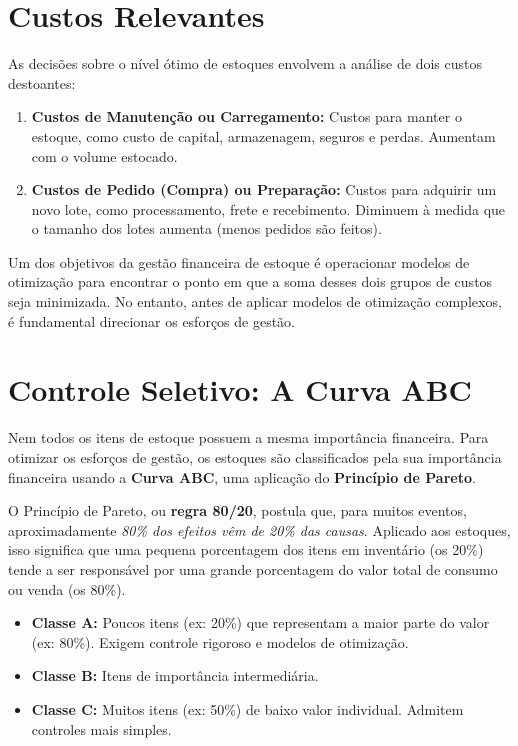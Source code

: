 \documentclass[
  a4paper,
]{book}
\providecommand{\tightlist}{%
  \setlength{\itemsep}{0pt}\setlength{\parskip}{0pt}}\usepackage{longtable,booktabs,array}
\begin{document}
\section{Custos Relevantes}\label{custos-relevantes}

As decisões sobre o nível ótimo de estoques envolvem a análise de dois
custos destoantes:

\begin{enumerate}
\def\labelenumi{\arabic{enumi}.}
\tightlist
\item
  \textbf{Custos de Manutenção ou Carregamento:} Custos para manter o
  estoque, como custo de capital, armazenagem, seguros e perdas.
  Aumentam com o volume estocado.
\item
  \textbf{Custos de Pedido (Compra) ou Preparação:} Custos para adquirir
  um novo lote, como processamento, frete e recebimento. Diminuem à
  medida que o tamanho dos lotes aumenta (menos pedidos são feitos).
\end{enumerate}

Um dos objetivos da gestão financeira de estoque é operacionar modelos
de otimização para encontrar o ponto em que a soma desses dois grupos de
custos seja minimizada. No entanto, antes de aplicar modelos de
otimização complexos, é fundamental direcionar os esforços de gestão.

\section{Controle Seletivo: A Curva
ABC}\label{controle-seletivo-a-curva-abc}

Nem todos os itens de estoque possuem a mesma importância financeira.
Para otimizar os esforços de gestão, os estoques são classificados pela
sua importância financeira usando a \textbf{Curva ABC}, uma aplicação do
\textbf{Princípio de Pareto}.

O Princípio de Pareto, ou \textbf{regra 80/20}, postula que, para muitos
eventos, aproximadamente \emph{80\% dos efeitos vêm de 20\% das causas}.
Aplicado aos estoques, isso significa que uma pequena porcentagem dos
itens em inventário (os 20\%) tende a ser responsável por uma grande
porcentagem do valor total de consumo ou venda (os 80\%).

\begin{itemize}
\tightlist
\item
  \textbf{Classe A:} Poucos itens (ex: 20\%) que representam a maior
  parte do valor (ex: 80\%). Exigem controle rigoroso e modelos de
  otimização.
\item
  \textbf{Classe B:} Itens de importância intermediária.
\item
  \textbf{Classe C:} Muitos itens (ex: 50\%) de baixo valor individual.
  Admitem controles mais simples.
\end{itemize}
\end{document}
